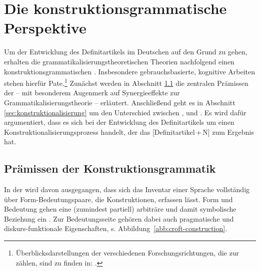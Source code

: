 \section{Die konstruktionsgrammatische Perspektive}\label{sec:kxg}
Um der Entwicklung des Definitartikels  im Deutschen auf den Grund zu gehen, erhalten die grammatikalisierungstheoretischen Theorien  nachfolgend einen konstruktionsgrammatischen  . Insbesondere gebrauchsbasierte, kognitive  Arbeiten \parencite[u.a.][]{Langacker1987,Goldberg1995,Goldberg2006,Croft2002,Croft2004,Bybee2006,Bybee2010} stehen hierfür Pate.\footnote{Überblicksdarstellungen der verschiedenen Forschungsrichtungen, die zur  zählen, sind zu finden in:   \textcite{Croft2004,Imo2007,Stefanowitsch2011,Hoffmann2013,Ziem2013}.} Zunächst werden in Abschnitt \ref{sec:kxg-grundlagen} die zentralen Prämissen der  -- mit besonderem Augenmerk auf Synergieeffekte zur  Grammatikalisierungstheorie -- erläutert. Anschließend geht es in Abschnitt \ref{sec:konstruktionalisierung} um den Unterschied zwischen ,   und . Es wird dafür argumentiert, dass es sich bei der Entwicklung des Definitartikels  um einen Konstruktionalisierungsprozess  handelt, der das   [Definitartikel\,+\,N] zum Ergebnis hat.  

\subsection{Prämissen der Konstruktionsgrammatik}\label{sec:kxg-grundlagen}


In der  wird davon ausgegangen, dass sich das Inventar einer Sprache vollständig über Form-Bedeutungspaare, die Konstruktionen, erfassen lässt. Form und Bedeutung gehen eine (zumindest partiell) arbiträre und damit symbolische Beziehung ein \parencite[257]{Croft2004}. Zur Bedeutungsseite gehören dabei auch pragmatische und diskurs-funktionale Eigenschaften, s. Abbildung~\ref{abb:croft-construction}.  

